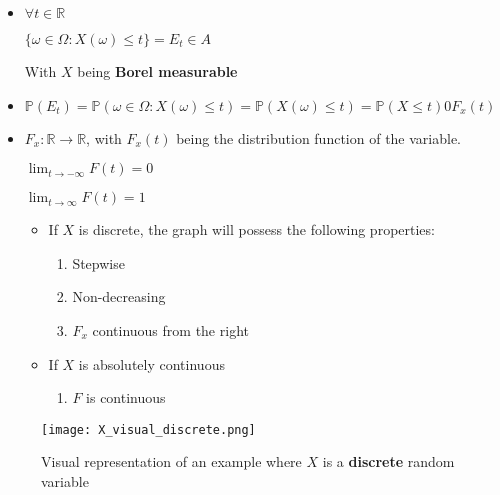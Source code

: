             \begin{itemize}
                \item \(\forall t \in \mathbb{R}\)

                    \( \{ \omega \in \Omega : X (\omega) \leq t \} = E_t \in A \)

                    With \(X\) being \textbf{Borel measurable}

                \item 

                    \( \mathbb{P} (E_t) = \mathbb{P} (\omega \in \Omega : X (\omega) \leq t ) = \mathbb{P} (X (\omega) \leq t) = \mathbb{P} (X \leq t)  0 F_x (t)  \)
 
                \item \(F_x : \mathbb{R} \rightarrow \mathbb{R}\), with \(F_x(t)\) being the distribution function of the variable.

                    \( \lim _{t \to - \infty} F(t) = 0 \)    

                    \( \lim _{t\to\infty} F(t) = 1\)

                    \begin{itemize}
                        \item If \(X\) is discrete, the graph will possess the following properties:
                            \begin{enumerate}
                                \item Stepwise
                                \item Non-decreasing 
                                \item \(F_x\) continuous from the right
                            \end{enumerate}
                        \item If \(X\) is \textcolor{dblue}{absolutely} continuous
                            \begin{enumerate}
                                \item \(F\) is continuous
                            \end{enumerate}
                    \end{itemize}
            \end{itemize}

            \begin{figure}[h]
                \centering
                \texttt{[image: X\_visual\_discrete.png]}
                \caption{Visual representation of an example where \(X\) is a \textbf{discrete} random variable}
                \label{fig:X_visual_discrete}
            \end{figure}

